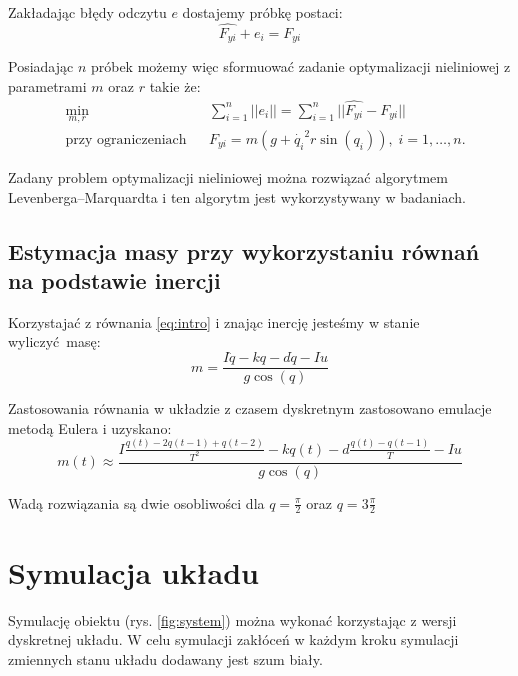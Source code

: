 \documentclass[a4paper, 10pt]{article}
\begin{document}
Zakładając błędy odczytu $e$ dostajemy próbkę postaci:
\begin{equation}
\hat{F_{yi}}+e_i  = F_{yi}
\end{equation}

Posiadając $n$ próbek możemy więc sformuować zadanie optymalizacji nieliniowej z parametrami $m$ oraz $r$ takie że:
\begin{equation}
\begin{aligned}
& \underset{m, r}{\text{min}}
& & \sum_{i = 1}^{n} || e_i || = \sum_{i = 1}^{n} || \hat{F_{yi}} - F_{yi} || \\
& \text{przy ograniczeniach}
& & F_{yi} = m(g + \dot{q_i}^2r\sin{(q_i)}), \; i = 1, \ldots, n.
\end{aligned}
\end{equation}

Zadany problem optymalizacji nieliniowej można rozwiązać algorytmem Levenberga–Marquardta i ten algorytm jest wykorzystywany w badaniach.


\subsection{Estymacja masy przy wykorzystaniu równań na podstawie inercji}
Korzystajać z równania \ref{eq:intro} i znając inercję jesteśmy w stanie wyliczyć masę:
\begin{equation}
m = \frac{I\ddot{q} - kq - d\dot{q} -Iu}{g\cos{(q)}}
\end{equation}

Zastosowania równania w układzie z czasem dyskretnym zastosowano emulacje metodą Eulera i uzyskano:
\begin{equation}
m(t) \approx \frac{I\frac{q(t)-2q(t-1)+q(t-2)}{T^2}-kq(t)-d\frac{q(t)-q(t-1)}{T}-Iu}{g\cos(q)}
\end{equation}

Wadą rozwiązania są dwie osobliwości dla $q = \frac{\pi}{2}$ oraz $q = 3\frac{\pi}{2}$

\section{Symulacja układu}

Symulację obiektu (rys. \ref{fig:system}) można wykonać korzystając z wersji dyskretnej układu. W celu symulacji zakłóceń w każdym kroku symulacji zmiennych stanu układu dodawany jest szum biały.
\end{document}
